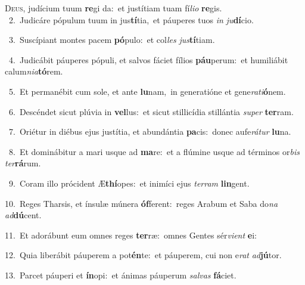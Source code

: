 \lettrine{\initial\textcolor{\initialcolor}{D}}{eus,} judícium tuum \textbf{re}\-gi da:~\star et justítiam tuam fí\-\textit{li}\-\textit{o} \textbf{re}\-gis.\\
{\numbfont\textcolor{\numbcolor}{~2.}}~Judicáre pópulum tuum in jus\-\textbf{tí}\-tia,~\star et páuperes tuos \textit{in} \textit{ju}\-\textbf{dí}cio.\par
{\numbfont\textcolor{\numbcolor}{~3.}}~Suscípiant montes pacem \textbf{pó}\-pulo:~\star et col\textit{les} \textit{jus}\-\textbf{tí}tiam.\par
{\numbfont\textcolor{\numbcolor}{~4.}}~Judicábit páuperes pópuli, et salvos fáciet fílios \textbf{páu}\-perum:~\star et humiliábit calum\-\textit{ni}\-\textit{a}\textbf{tó}rem.\par
{\numbfont\textcolor{\numbcolor}{~5.}}~Et permanébit cum sole, et ante \textbf{lu}\-nam,~\star in generatióne et gene\-\textit{ra}\-\textit{ti}\textbf{ó}nem.\par
{\numbfont\textcolor{\numbcolor}{~6.}}~Descéndet sicut plúvia in \textbf{vel}\-lus:~\star et sicut stillicídia stillántia \textit{su}\-\textit{per} \textbf{ter}\-ram.\par
{\numbfont\textcolor{\numbcolor}{~7.}}~Oriétur in diébus ejus justítia, et abundántia \textbf{pa}\-cis:~\star donec aufe\-\textit{rá}\-\textit{tur} \textbf{lu}\-na.\par
{\numbfont\textcolor{\numbcolor}{~8.}}~Et dominábitur a mari usque ad \textbf{ma}\-re:~\star et a flúmine usque ad términos or\textit{bis} \textit{ter}\-\textbf{rá}rum.\par
{\numbfont\textcolor{\numbcolor}{~9.}}~Coram illo prócident Æ\-\textbf{thí}\-opes:~\star et inimíci ejus \textit{ter}\-\textit{ram} \textbf{lin}\-gent.\par
{\numbfont\textcolor{\numbcolor}{10.}}~Reges Tharsis, et ínsulæ múnera \textbf{óf}\-ferent:~\star reges Arabum et Saba do\textit{na} \textit{ad}\-\textbf{dú}cent.\par
{\numbfont\textcolor{\numbcolor}{11.}}~Et adorábunt eum omnes reges \textbf{ter}\-ræ:~\star omnes Gentes sér\-\textit{vi}\-\textit{ent} \textbf{e}\-i:\par
{\numbfont\textcolor{\numbcolor}{12.}}~Quia liberábit páuperem a pot\-\textbf{én}\-te:~\star et páuperem, cui non e\textit{rat} \textit{ad}\-\textbf{jú}tor.\par
{\numbfont\textcolor{\numbcolor}{13.}}~Parcet páuperi et \textbf{ín}\-opi:~\star et ánimas páuperum \textit{sal}\-\textit{vas} \textbf{fá}\-ciet.\par
